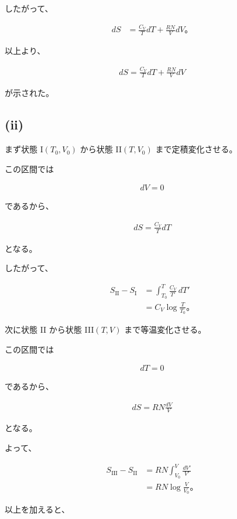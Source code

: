 \documentclass[platex,dvipdfmx,a4paper]{jsarticle}
\begin{document}
したがって、

\begin{align*}
dS
&=
\frac{C_V}{T}dT
+
\frac{RN}{V}dV。
\end{align*}

以上より、

\begin{align*}
dS
=
\frac{C_V}{T}dT
+
\frac{RN}{V}dV
\end{align*}

が示された。

\subsection{(ii)}

まず状態 I$(T_0,V_0)$ から状態 II$(T,V_0)$ まで定積変化させる。

この区間では

\begin{align*}
dV=0
\end{align*}

であるから、

\begin{align*}
dS
=
\frac{C_V}{T}dT
\end{align*}

となる。

したがって、

\begin{align*}
S_{\mathrm{II}}-S_{\mathrm{I}}
&=
\int_{T_0}^{T}
\frac{C_V}{T'}\,dT' \\
&=
C_V
\log\frac{T}{T_0}。
\end{align*}

次に状態 II から状態 III$(T,V)$ まで等温変化させる。

この区間では

\begin{align*}
dT=0
\end{align*}

であるから、

\begin{align*}
dS
=
RN\frac{dV}{V}
\end{align*}

となる。

よって、

\begin{align*}
S_{\mathrm{III}}-S_{\mathrm{II}}
&=
RN
\int_{V_0}^{V}
\frac{dV'}{V'} \\
&=
RN
\log\frac{V}{V_0}。
\end{align*}

以上を加えると、
\end{document}
